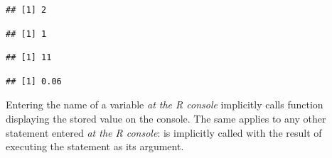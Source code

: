 \documentclass[krantz2]{krantz}\usepackage{knitr}%
\begin{document}
\begin{knitrout}\footnotesize
{}\color{fgcolor}\begin{kframe}
\begin{alltt}
 \hlkwb{<-} 
 \hlopt{+} 
\end{alltt}
\begin{verbatim}
## [1] 2
\end{verbatim}
\begin{alltt}
\end{alltt}
\begin{verbatim}
## [1] 1
\end{verbatim}
\begin{alltt}
 \hlkwb{<-} 
 \hlkwb{<-}  \hlopt{+} 
\end{alltt}
\begin{verbatim}
## [1] 11
\end{verbatim}
\begin{alltt}
 \hlopt{*} 
\end{alltt}
\begin{verbatim}
## [1] 0.06
\end{verbatim}
\end{kframe}
\end{knitrout}

Entering the name of a variable \emph{at the R console} implicitly calls function  displaying the stored value on the console. The same applies to any other statement entered \emph{at the R console}:  is implicitly called with the result of executing the statement as its argument.
\end{document}

